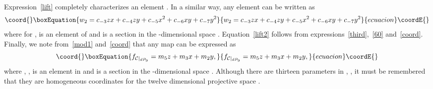 \documentclass[a4paper,12pt]{article}
\numberwithin{equation}{section}
\theoremstyle{plain}
\begin{document}
Expression~\eqref{lift} completely characterizes an element
\coordHE{}. In a similar way, any element
\coordHE{}
can be written
as
%
\begin{equation}\coord{}\boxEquation{
w_{2} = c_{-3} zx + c_{-4} zy + c_{-5} x^2 + c_{-6}xy + c_{-7} y^2
\label{lift2}
}{
w_{2} = c_{-3} zx + c_{-4} zy + c_{-5} x^2 + c_{-6}xy + c_{-7} y^2
}{ecuacion}\coordE{}\end{equation}
%
where for \coordHE{}, \coordHE{} is an element of
\coordHE{} and \coordHE{} is a section in the
\coordHE{}-dimensional space \coordHE{}.
Equation~\eqref{lift2} follows from expressions~\eqref{third},~\eqref{60}
and~\eqref{coord}. Finally, we note from~\eqref{mod1} and~\eqref{coord} that
any map
\coordHE{} can be expressed as
%
\begin{equation}\coord{}\boxEquation{
f_{{\cal{C}}|_{dP_{9}}} = m_5 z + m_3 x + m_2 y,
\label{lift3}
}{
f_{{\cal{C}}|_{dP_{9}}} = m_5 z + m_3 x + m_2 y,
}{ecuacion}\coordE{}\end{equation}
%
where \coordHE{}, \coordHE{}, is an element in
\coordHE{} and \coordHE{} is a section in the
\coordHE{}-dimensional space \coordHE{}.
Although
there are thirteen parameters in \coordHE{}, \coordHE{}, it must be remembered
that
they are homogeneous coordinates for the twelve dimensional projective
space
\coordHE{}.
\end{document}
